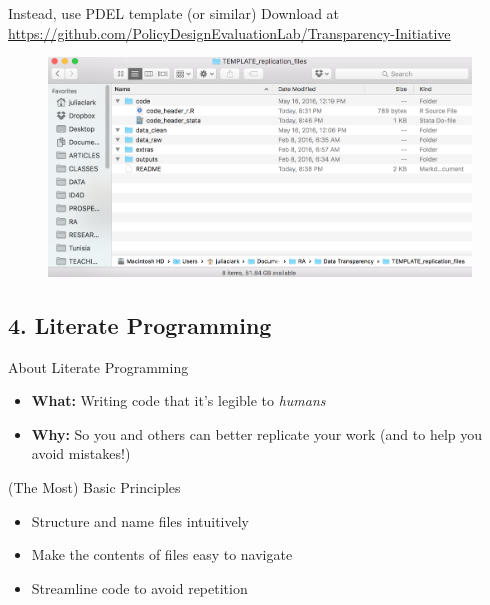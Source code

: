 \documentclass[12pt, compress, handout]{beamer}
\let\noteitem\item %
\renewcommand{\item}{ 
	\noteitem\vspace{\fill}
	}
\begin{document}
	\begin{frame}{Instead, use PDEL template (or similar)}
	\centering
	Download at \url{https://github.com/PolicyDesignEvaluationLab/Transparency-Initiative}
			\begin{figure}[H]
			  \includegraphics[width= \textwidth]{pdel_structure}
			\end{figure}
	\end{frame}
	
	
\subsection{4. Literate Programming}	

	\begin{frame}{About Literate Programming}
		\begin{itemize}
			\item \textbf{What:} Writing code that it's legible to \textit{humans}
			\item \textbf{Why:} So you and others can better replicate your work (and to help you avoid mistakes!)
		\end{itemize}
	\end{frame}
	
	\begin{frame}{(The Most) Basic Principles}
		\begin{itemize}
			\item Structure and name files intuitively
			\item Make the contents of files easy to navigate
			\item Streamline code to avoid repetition
		\end{itemize}
	\end{frame}
	
\end{document}
